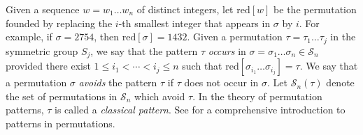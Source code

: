\documentclass[
final,nomarks
]{dmtcs-episciences}
\newcommand{\red}{\mathrm{red}}
\newcommand{\Sn}[1]{\mathcal{S}_{#1}}
\begin{document}
Given a sequence \begin{math}w = w_1 \ldots w_n\end{math} of distinct integers,
let \begin{math}\red[w]\end{math} be the permutation founded by replacing the
\begin{math}i\end{math}-th smallest integer that appears in \begin{math}\sigma\end{math} by \begin{math}i\end{math}.  For
example, if \begin{math}\sigma = 2754\end{math}, then \begin{math}\red[\sigma] = 1432\end{math}.  Given a
permutation \begin{math}\tau=\tau_1 \ldots \tau_j\end{math} in the symmetric group \begin{math}S_j\end{math}, we say that the pattern \begin{math}\tau\end{math} \emph{occurs} in \begin{math}\sigma = \sigma_1 \ldots \sigma_n \in \Sn{n}\end{math} provided   there exist \begin{math}1 \leq i_1 < \cdots < i_j \leq n\end{math} such that 
\begin{math}\red[\sigma_{i_1} \ldots \sigma_{i_j}] = \tau\end{math}.   We say 
that a permutation \begin{math}\sigma\end{math} \emph{avoids} the pattern \begin{math}\tau\end{math} if \begin{math}\tau\end{math} does not 
occur in \begin{math}\sigma\end{math}. Let \begin{math}\Sn{n}(\tau)\end{math} denote the set of permutations in \begin{math}\Sn{n}\end{math} 
which avoid \begin{math}\tau\end{math}. In the theory of permutation patterns,   \begin{math}\tau\end{math} is called a \emph{classical pattern}. See \cite{kit} for a comprehensive introduction to 
patterns in permutations. 
\end{document}
